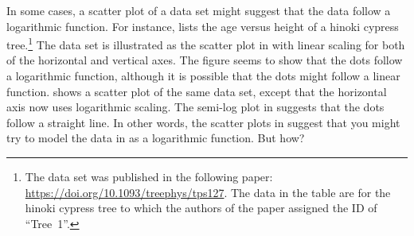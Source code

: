 \documentclass[a4paper,oneside,12pt]{article}
\begin{document}
In some cases, a scatter plot of a data set might suggest that the
data follow a logarithmic function.  For instance,
 lists the age versus height of a
hinoki cypress tree.\footnote{
  The data set was published in the following paper:
  \url{https://doi.org/10.1093/treephys/tps127}.
  The data in the table are for the hinoki cypress tree to which the
  authors of the paper assigned the ID of ``Tree~1''.
}
The data set is illustrated as the scatter plot in
 with linear scaling for
both of the horizontal and vertical axes.  The figure seems to show
that the dots follow a logarithmic function, although it is possible
that the dots might follow a linear function.
 shows a scatter plot of the
same data set, except that the horizontal axis now uses logarithmic
scaling.  The semi-log plot in
 suggests that the dots
follow a straight line.  In other words, the scatter plots in
 suggest that you might try to
model the data in  as a
logarithmic function.  But how?

\begin{table}[!htbp]
\centering

\caption{%
  The age of a hinoki cypress tree versus its height.  Age is measured
  in tree years and height is measured in metres.
}
\label{tab:logarithm:hinoki_cypress}
\end{table}
\end{document}
